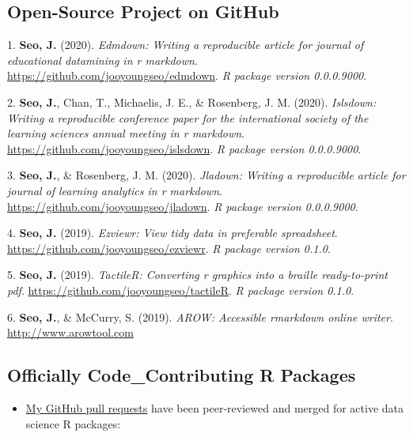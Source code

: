 \documentclass[11pt,a4paper,]{awesome-cv}
\providecommand{\tightlist}{%
	\setlength{\itemsep}{0pt}\setlength{\parskip}{0pt}}
\begin{document}
\newpage

\hypertarget{open-source-project-on-github}{%
  \subsection{Open-Source Project on
    GitHub}\label{open-source-project-on-github}}

\hypertarget{bibliography}{}
\leavevmode\hypertarget{ref-R-edmdown}{}%
1. \textbf{Seo, J.} (2020). \emph{Edmdown: Writing a reproducible
  article for journal of educational datamining in r markdown}.
\url{https://github.com/jooyoungseo/edmdown}. \emph{R package version
  0.0.0.9000}.

\leavevmode\hypertarget{ref-R-islsdown}{}%
2. \textbf{Seo, J.}, Chan, T., Michaelis, J. E., \& Rosenberg, J. M.
(2020). \emph{Islsdown: Writing a reproducible conference paper for the
  international society of the learning sciences annual meeting in r
  markdown}. \url{https://github.com/jooyoungseo/islsdown}. \emph{R
  package version 0.0.0.9000}.

\leavevmode\hypertarget{ref-R-jladown}{}%
3. \textbf{Seo, J.}, \& Rosenberg, J. M. (2020). \emph{Jladown: Writing
  a reproducible article for journal of learning analytics in r markdown}.
\url{https://github.com/jooyoungseo/jladown}. \emph{R package version
  0.0.0.9000}.

\leavevmode\hypertarget{ref-R-ezviewr}{}%
4. \textbf{Seo, J.} (2019). \emph{Ezviewr: View tidy data in preferable
  spreadsheet}. \url{https://github.com/jooyoungseo/ezviewr}. \emph{R
  package version 0.1.0}.

\leavevmode\hypertarget{ref-R-tactileR}{}%
5. \textbf{Seo, J.} (2019). \emph{TactileR: Converting r graphics into a
  braille ready-to-print pdf}.
\url{https://github.com/jooyoungseo/tactileR}. \emph{R package version
  0.1.0}.

\leavevmode\hypertarget{ref-webrender}{}%
6. \textbf{Seo, J.}, \& McCurry, S. (2019). \emph{AROW: Accessible
  rmarkdown online writer}. \url{http://www.arowtool.com}

\hypertarget{officially-code_contributing-r-packages}{%
  \subsection{Officially Code\_Contributing R
    Packages}\label{officially-code_contributing-r-packages}}

\begin{itemize}
  \tightlist
  \item
        \href{https://github.com/pulls?q=is\%3Apr+author\%3Ajooyoungseo+archived\%3Afalse+is\%3Aclosed}{My
          GitHub pull requests} have been peer-reviewed and merged for active
        data science R packages:
\end{itemize}
\end{document}
